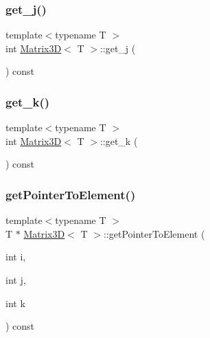 \mbox{\label{classMatrix3D_a083e3f136a0108aad991e194b078db7f_a083e3f136a0108aad991e194b078db7f}} 
\subsubsection{\texorpdfstring{get\+\_\+j()}{get\_j()}}
{\footnotesize\ttfamily template$<$typename T $>$ \\
int \mbox{\hyperlink{classMatrix3D}{Matrix3D}}$<$ T $>$\+::get\+\_\+j (\begin{DoxyParamCaption}{ }\end{DoxyParamCaption}) const}

\mbox{\label{classMatrix3D_a35fad9c3c81914e0ef5ed40ceda5d324_a35fad9c3c81914e0ef5ed40ceda5d324}} 
\subsubsection{\texorpdfstring{get\+\_\+k()}{get\_k()}}
{\footnotesize\ttfamily template$<$typename T $>$ \\
int \mbox{\hyperlink{classMatrix3D}{Matrix3D}}$<$ T $>$\+::get\+\_\+k (\begin{DoxyParamCaption}{ }\end{DoxyParamCaption}) const}

\mbox{\label{classMatrix3D_ac21cf8967053b928f609b98abf1616e2_ac21cf8967053b928f609b98abf1616e2}} 
\subsubsection{\texorpdfstring{get\+Pointer\+To\+Element()}{getPointerToElement()}}
{\footnotesize\ttfamily template$<$typename T $>$ \\
T $\ast$ \mbox{\hyperlink{classMatrix3D}{Matrix3D}}$<$ T $>$\+::get\+Pointer\+To\+Element (\begin{DoxyParamCaption}\item[{int}]{i,  }\item[{int}]{j,  }\item[{int}]{k }\end{DoxyParamCaption}) const}

